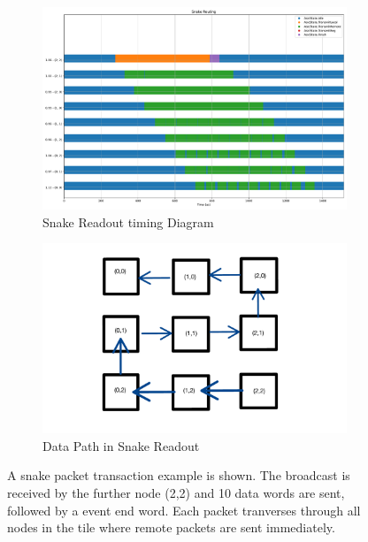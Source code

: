 \begin{figure}
\centering
\begin{subfigure}{.5\textwidth}
  \centering
  \includegraphics[width=\textwidth]{images/snake_timer.pdf}
  \caption{Snake Readout timing Diagram}
\end{subfigure}%
\begin{subfigure}{.5\textwidth}
  \centering
  \includegraphics[width=\textwidth]{images/snake_ex_read.pdf}
  \caption{Data Path in Snake Readout}
\end{subfigure}
\caption{A snake packet transaction example is shown. The broadcast is received by the further node (2,2) and 10 data words are sent, followed by a event end word.
Each packet tranverses through all nodes in the tile where remote packets are sent immediately.}
\label{fig:snake_packet_drift}
\end{figure}

